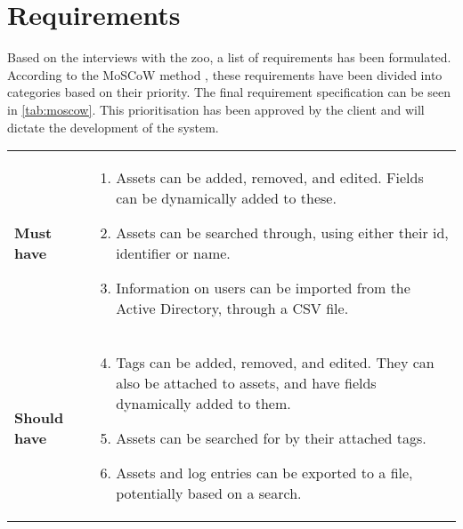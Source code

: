 \section{Requirements}\label{sc:requirements}
Based on the interviews with the zoo, a list of requirements has been formulated. According to the MoSCoW method \citep[chap 7.1]{DEB}, these requirements have been divided into categories based on their priority. The final requirement specification can be seen in \autoref{tab:moscow}. This prioritisation has been approved by the client and will dictate the development of the system.

\begin{longtable}{p{3.2cm} p{10cm}}
    \renewcommand{\arraystretch}{2.0}
        \\
        \hline
        \textbf{Must have} & 
        \vspace*{-7mm}
        \begin{enumerate} \itemsep0em
        
            \item Assets can be added, removed, and edited. Fields can be dynamically added to these.
            
            \item Assets can be searched through, using either their id, identifier or name.
            
            \item Information on users can be imported from the Active Directory, through a CSV file.
            
        \end{enumerate}
        \\
        \hline
        
        \textbf{Should have} & 
        \vspace*{-7mm}
        \begin{enumerate} \setcounter{enumi}{3} \itemsep0em 
            
            \item Tags can be added, removed, and edited. They can also be attached to assets, and have fields dynamically added to them.
            
            \item Assets can be searched for by their attached tags.
            
            \item Assets and log entries can be exported to a file, potentially based on a search.
            

\end{enumerate}
\end{longtable}
